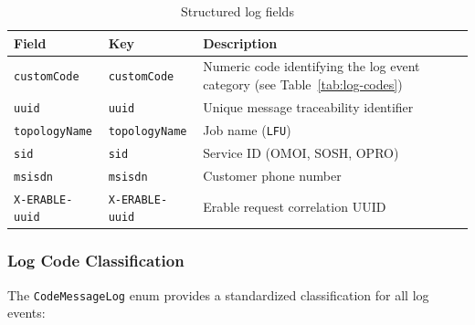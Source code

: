 \begin{table}[H]
    \centering
    \caption{Structured log fields}
    \label{tab:log-keys}
    \begin{tabularx}{\textwidth}{l l X}
\toprule
\textbf{Field} & \textbf{Key} & \textbf{Description} \\
\midrule
\texttt{customCode} & \texttt{customCode} & Numeric code identifying the log event category (see Table~\ref{tab:log-codes}) \\
\texttt{uuid} & \texttt{uuid} & Unique message traceability identifier \\
\texttt{topologyName} & \texttt{topologyName} & Job name (\texttt{LFU}) \\
\texttt{sid} & \texttt{sid} & Service ID (OMOI, SOSH, OPRO) \\
\texttt{msisdn} & \texttt{msisdn} & Customer phone number \\
\texttt{X-ERABLE-uuid} & \texttt{X-ERABLE-uuid} & Erable request correlation UUID \\
\bottomrule
    \end{tabularx}
\end{table}

\subsubsection{Log Code Classification}

The \texttt{CodeMessageLog} enum provides a standardized classification for all log events:

